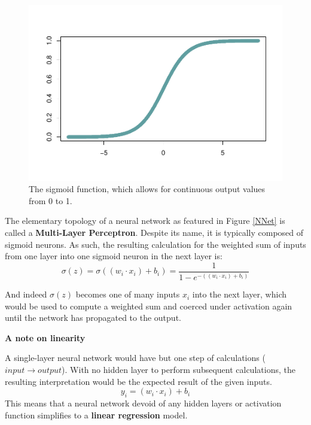 \begin{figure}[H]
    \centering
   \vspace{-40pt}
    \includegraphics[width = .7\textwidth]{Figures/sigmoid-function-1.pdf}
   \vspace{-40pt}
    \caption{\footnotesize The sigmoid function, which allows for continuous output values from 0 to 1.}
\end{figure}


The elementary topology of a neural network as featured in Figure \ref{NNet} is called a \textbf{Multi-Layer Perceptron}.  Despite its name, it is typically composed of sigmoid neurons.  As such, the resulting calculation for the weighted sum of inputs from one layer into one sigmoid neuron in the next layer is:
$$
\sigma(z) = \sigma((w_i \cdot x_i) + b_i) = \frac{1}{1-e^{-((w_i \cdot x_i) + b_i)}}
$$

And indeed $\sigma(z)$ becomes one of many inputs $x_i$ into the next layer, which would be used to compute a weighted sum and coerced under activation again until the network has propagated to the output.








\textbf{A note on linearity}

A single-layer neural network would have but one step of calculations ($input \rightarrow output$).  With no hidden layer to perform subsequent calculations, the resulting interpretation would be the expected result of the given inputs.
$$
y_i = (w_i \cdot x_i) + b_i
$$
This means that a neural network devoid of any hidden layers or activation function simplifies to a \textbf{linear regression} model. \cite{sharma2017activation}


